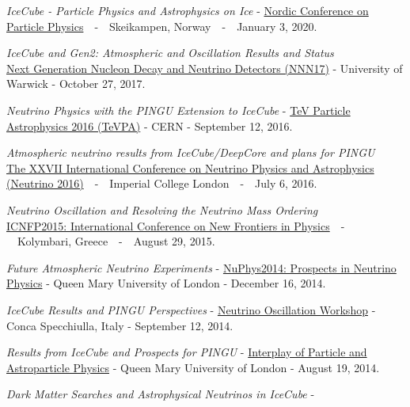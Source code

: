 \documentclass[a4paper,11pt]{article}
\newcounter{bar}
\begin{document}
\begin{multicols}{2}
\begin{etaremune}[topsep=0pt,itemsep=4pt,partopsep=0pt,parsep=0pt]
\itemsep 3.5pt
%
\item{\textit{IceCube - Particle Physics and Astrophysics on Ice} - 
\href{https://indico.nbi.ku.dk/event/1259/}{Nordic Conference on Particle Physics}~~-~~Skeikampen, Norway~~-~~January 3, 2020.}
%
%
\item{\textit{IceCube and Gen2: Atmospheric and Oscillation Results and Status} \\ 
\href{https://www.iopconferences.org/iop/frontend/reg/thome.csp?pageID=583922&eventID=1058&traceRedir=2&eventID=1058}{Next Generation Nucleon Decay and Neutrino Detectors (NNN17)} - University of Warwick - October 27, 2017.}
%
\item{\textit{Neutrino Physics with the PINGU Extension to IceCube}  - 
 \href{https://indico.cern.ch/event/469963/}{TeV Particle Astrophysics 2016 (TeVPA)} - CERN - September 12, 2016.}
%
%
 \item{\textit{Atmospheric neutrino results from IceCube/DeepCore and plans for PINGU} \\
 \href{http://neutrino2016.iopconfs.org/home}{The XXVII International Conference on Neutrino Physics and Astrophysics (Neutrino 2016)}~~-~~Imperial College London~~-~~July 6, 2016.}
%
\item{\textit{Neutrino Oscillation and Resolving the Neutrino Mass Ordering} \\
\href{http://indico.cern.ch/event/344173/overview}{ICNFP2015: International Conference on New Frontiers in Physics}~~-~~Kolymbari, Greece~~-~~August 29, 2015.}
\item{\textit{Future Atmospheric Neutrino Experiments} -
\href{https://indico.ph.qmul.ac.uk/indico/conferenceDisplay.py?confId=22}{NuPhys2014: Prospects in Neutrino Physics} - Queen Mary University of London - December 16, 2014.}
%
\item{\textit{IceCube Results and PINGU Perspectives} - 
\href{http://www.ba.infn.it/~now/now2014/web-content/index.html}{Neutrino Oscillation Workshop} - Conca Specchiulla, Italy - September 12, 2014.}
%
\item{\textit{Results from IceCube and Prospects for PINGU} - 
\href{http://pprc.qmul.ac.uk/research/ipa2014}{Interplay of Particle and Astroparticle Physics} - Queen Mary University of London - August 19, 2014.}
%
\item{\textit{Dark Matter Searches and Astrophysical Neutrinos in IceCube} - 
}
\end{etaremune}
\end{multicols}
\end{document}

